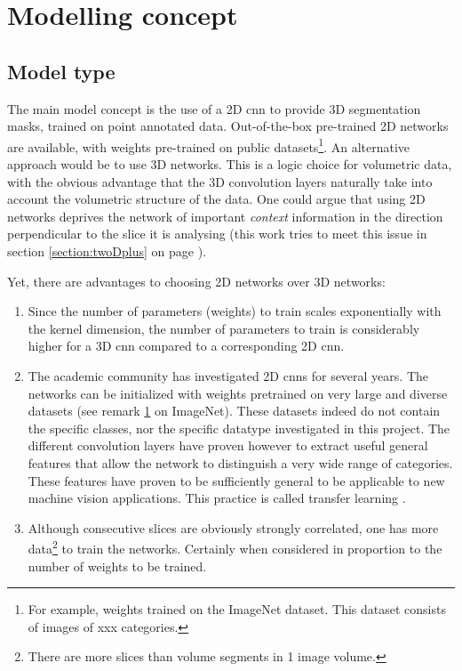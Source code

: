 \section{Modelling concept\label{sec:model_concept}}

\subsection{Model type}
\par{
    The main model concept is the use of a 2D \acrfull{cnn} to provide 3D segmentation masks, trained on point annotated data.
    Out-of-the-box pre-trained 2D networks are available, with weights pre-trained on public datasets\footnote{\label{footnote:Imagenet}For example, weights trained on the ImageNet dataset. 
    This dataset consists of  images of xxx categories.}.
    An alternative approach would be to use 3D networks. This is a logic choice for volumetric data, with the obvious advantage that the 3D convolution layers naturally take into account the volumetric structure of the data.
    One could argue that using 2D networks deprives the network of important \textit{context} information in the direction perpendicular to the slice it is analysing (this work tries to meet this issue in section \ref{section:twoDplus} on page \pageref{section:twoDplus}).     
}

Yet, there are advantages to choosing 2D networks over 3D networks:
\begin{enumerate}
    \item Since the number of parameters (weights) to train scales exponentially with the kernel dimension, the number of parameters to train is considerably higher for a 3D \acrshort{cnn} compared to a corresponding 2D \acrshort{cnn}.
    \item The academic community has investigated 2D \acrlong{cnn}s for several years. The networks can be initialized with weights pretrained on very large and diverse datasets (see remark \ref{footnote:Imagenet} on ImageNet). 
    These datasets indeed do not contain the specific classes, nor the specific datatype investigated in this project. 
    The different convolution layers have proven however to extract useful general features that allow the network to distinguish a very wide range of categories. 
    These features have proven to be sufficiently general to be applicable to new machine vision applications. This practice is called transfer learning .
    \item Although consecutive slices are obviously strongly correlated, one has more data\footnote{There are more slices than volume segments in 1 image volume.} to train the networks. Certainly when considered in proportion to the number of weights to be trained.
\end{enumerate}

